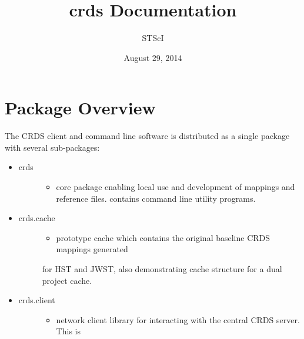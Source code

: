 \documentclass[letterpaper,10pt,english]{sphinxmanual}
\title{crds Documentation}
\date{August 29, 2014}
\author{STScI}
\begin{document}
\maketitle
\tableofcontents
{}\label{index::doc}



\chapter{Package Overview}
\label{installation:package-overview}\label{installation:crds-user-manual}\label{installation::doc}
The CRDS client and command line software is distributed as a single package with
several sub-packages:
\begin{itemize}
\item {} \begin{description}
\item[{crds}] \leavevmode\begin{itemize}
\item {} 
core package enabling local use and development of mappings
and reference files.  contains command line utility programs.

\end{itemize}

\end{description}

\item {} \begin{description}
\item[{crds.cache}] \leavevmode\begin{itemize}
\item {} 
prototype cache which contains the original baseline CRDS mappings generated

\end{itemize}

for HST and JWST,  also demonstrating cache structure for a dual project cache.

\end{description}

\item {} \begin{description}
\item[{crds.client}] \leavevmode\begin{itemize}
\item {} 
network client library for interacting with the central CRDS server.  This is

\end{itemize}


\end{description}
\end{itemize}
\end{document}
